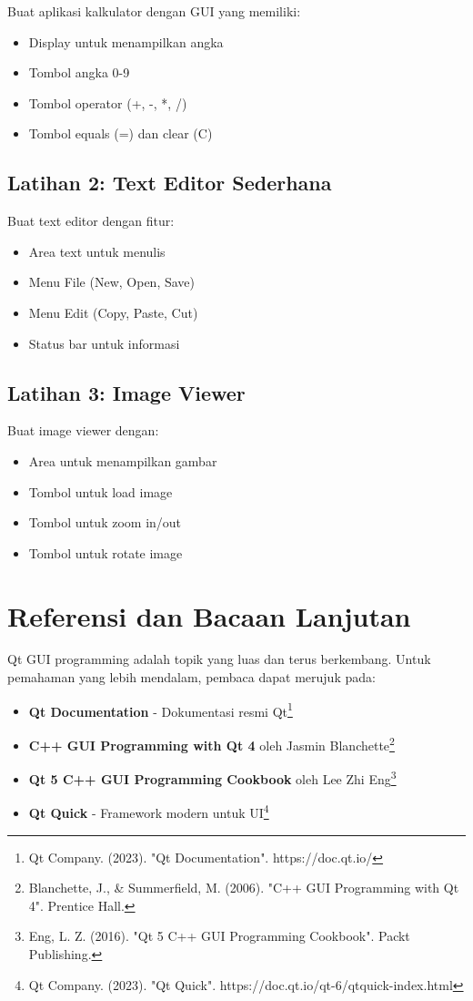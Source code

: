 Buat aplikasi kalkulator dengan GUI yang memiliki:
\begin{itemize}
\item Display untuk menampilkan angka
\item Tombol angka 0-9
\item Tombol operator (+, -, *, /)
\item Tombol equals (=) dan clear (C)
\end{itemize}

\subsection{Latihan 2: Text Editor Sederhana}

Buat text editor dengan fitur:
\begin{itemize}
\item Area text untuk menulis
\item Menu File (New, Open, Save)
\item Menu Edit (Copy, Paste, Cut)
\item Status bar untuk informasi
\end{itemize}

\subsection{Latihan 3: Image Viewer}

Buat image viewer dengan:
\begin{itemize}
\item Area untuk menampilkan gambar
\item Tombol untuk load image
\item Tombol untuk zoom in/out
\item Tombol untuk rotate image
\end{itemize}

\section{Referensi dan Bacaan Lanjutan}

Qt GUI programming adalah topik yang luas dan terus berkembang. Untuk pemahaman yang lebih mendalam, pembaca dapat merujuk pada:

\begin{itemize}
\item \textbf{Qt Documentation} - Dokumentasi resmi Qt\footnote{Qt Company. (2023). "Qt Documentation". https://doc.qt.io/}
\item \textbf{C++ GUI Programming with Qt 4} oleh Jasmin Blanchette\footnote{Blanchette, J., \& Summerfield, M. (2006). "C++ GUI Programming with Qt 4". Prentice Hall.}
\item \textbf{Qt 5 C++ GUI Programming Cookbook} oleh Lee Zhi Eng\footnote{Eng, L. Z. (2016). "Qt 5 C++ GUI Programming Cookbook". Packt Publishing.}
\item \textbf{Qt Quick} - Framework modern untuk UI\footnote{Qt Company. (2023). "Qt Quick". https://doc.qt.io/qt-6/qtquick-index.html}
\end{itemize}

